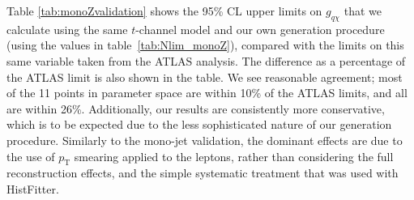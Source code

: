 Table \ref{tab:monoZvalidation} shows the 95\% CL upper limits on $g_{q \chi}$ that we calculate using the same $t$-channel model and our own generation procedure (using the values in table~\ref{tab:Nlim_monoZ}), compared with the limits on this same variable taken from the ATLAS analysis. The difference as a percentage of the ATLAS limit is also shown in the table. We see reasonable agreement; most of the 11 points in parameter space are within 10\% of the ATLAS limits, and all are within 26\%. Additionally, our results are consistently more conservative, which is to be expected due to the less sophisticated nature of our generation procedure. Similarly to the mono-jet validation, the dominant effects are due to the use of $p_{\mathrm{T}}$ smearing applied to the leptons, rather than considering the full reconstruction effects, and the simple systematic treatment that was used with HistFitter.


\iffalse

\subsection{Mono-W/Z Channel}
\label{monoWZ_validation}
\comm{Johanna, please put your validation results here.}

\fi
